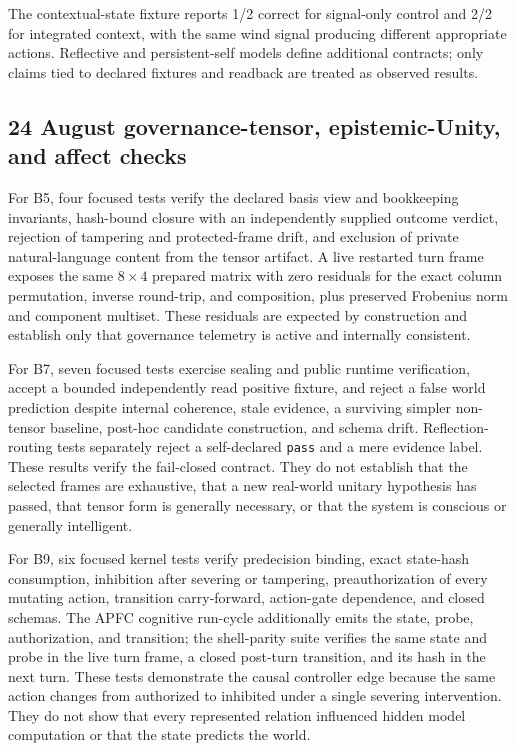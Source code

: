 \documentclass[10pt,twocolumn]{article}
\theoremstyle{definition}
\theoremstyle{plain}
\theoremstyle{remark}
\newcommand{\file}[1]{\nolinkurl{#1}}
\newcommand{\turnunity}{\textsf{B5}}
\newcommand{\epistemicunity}{\textsf{B7}}
\newcommand{\causalunity}{\textsf{B9}}
\begin{document}
The contextual-state fixture reports 1/2 correct for signal-only control and 2/2 for integrated context, with the same wind signal producing different appropriate actions.  Reflective and persistent-self models define additional contracts; only claims tied to declared fixtures and readback are treated as observed results.

\subsection{24 August governance-tensor, epistemic-Unity, and affect checks}

For \turnunity{}, four focused tests verify the declared basis view and bookkeeping invariants, hash-bound closure with an independently supplied outcome verdict, rejection of tampering and protected-frame drift, and exclusion of private natural-language content from the tensor artifact.  A live restarted turn frame exposes the same $8\times4$ prepared matrix with zero residuals for the exact column permutation, inverse round-trip, and composition, plus preserved Frobenius norm and component multiset.  These residuals are expected by construction and establish only that governance telemetry is active and internally consistent.

For \epistemicunity{}, seven focused tests exercise sealing and public runtime verification, accept a bounded independently read positive fixture, and reject a false world prediction despite internal coherence, stale evidence, a surviving simpler non-tensor baseline, post-hoc candidate construction, and schema drift.  Reflection-routing tests separately reject a self-declared \file{pass} and a mere evidence label.  These results verify the fail-closed contract.  They do not establish that the selected frames are exhaustive, that a new real-world unitary hypothesis has passed, that tensor form is generally necessary, or that the system is conscious or generally intelligent.

For \causalunity{}, six focused kernel tests verify predecision binding, exact state-hash consumption, inhibition after severing or tampering, preauthorization of every mutating action, transition carry-forward, action-gate dependence, and closed schemas.  The APFC cognitive run-cycle additionally emits the state, probe, authorization, and transition; the shell-parity suite verifies the same state and probe in the live turn frame, a closed post-turn transition, and its hash in the next turn.  These tests demonstrate the causal controller edge because the same action changes from authorized to inhibited under a single severing intervention.  They do not show that every represented relation influenced hidden model computation or that the state predicts the world.
\end{document}
